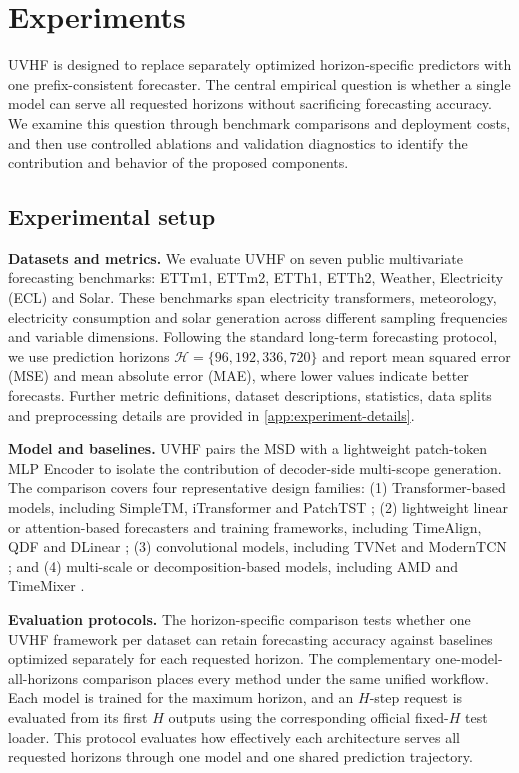 \documentclass[final,3p,times]{elsarticle}
\begin{document}
\section{Experiments}
\label{sec:experiments}


UVHF is designed to replace separately optimized horizon-specific predictors with one prefix-consistent forecaster. The central empirical question is whether a single model can serve all requested horizons without sacrificing forecasting accuracy. We examine this question through benchmark comparisons and deployment costs, and then use controlled ablations and validation diagnostics to identify the contribution and behavior of the proposed components.

\subsection{Experimental setup}


\textbf{Datasets and metrics.} We evaluate UVHF on seven public multivariate forecasting benchmarks: ETTm1, ETTm2, ETTh1, ETTh2, Weather, Electricity (ECL) and Solar. These benchmarks span electricity transformers, meteorology, electricity consumption and solar generation across different sampling frequencies and variable dimensions. Following the standard long-term forecasting protocol, we use prediction horizons $\mathcal H=\{96,192,336,720\}$ and report mean squared error (MSE) and mean absolute error (MAE), where lower values indicate better forecasts. Further metric definitions, dataset descriptions, statistics, data splits and preprocessing details are provided in \ref{app:experiment-details}.

\textbf{Model and baselines.} UVHF pairs the MSD with a lightweight patch-token MLP Encoder to isolate the contribution of decoder-side multi-scope generation. The comparison covers four representative design families: (1) Transformer-based models, including SimpleTM, iTransformer and PatchTST \citep{chen2025simpletm,liu2024itransformer,nie2023patchtst}; (2) lightweight linear or attention-based forecasters and training frameworks, including TimeAlign, QDF and DLinear \citep{hu2026timealign,wang2026qdf,zeng2023dlinear}; (3) convolutional models, including TVNet and ModernTCN \citep{li2025tvnet,luo2024moderntcn}; and (4) multi-scale or decomposition-based models, including AMD and TimeMixer \citep{hu2025amd,wang2024timemixer}.

\textbf{Evaluation protocols.} The horizon-specific comparison tests whether one UVHF framework per dataset can retain forecasting accuracy against baselines optimized separately for each requested horizon. The complementary one-model-all-horizons comparison places every method under the same unified workflow. Each model is trained for the maximum horizon, and an $H$-step request is evaluated from its first $H$ outputs using the corresponding official fixed-$H$ test loader. This protocol evaluates how effectively each architecture serves all requested horizons through one model and one shared prediction trajectory.
\end{document}
